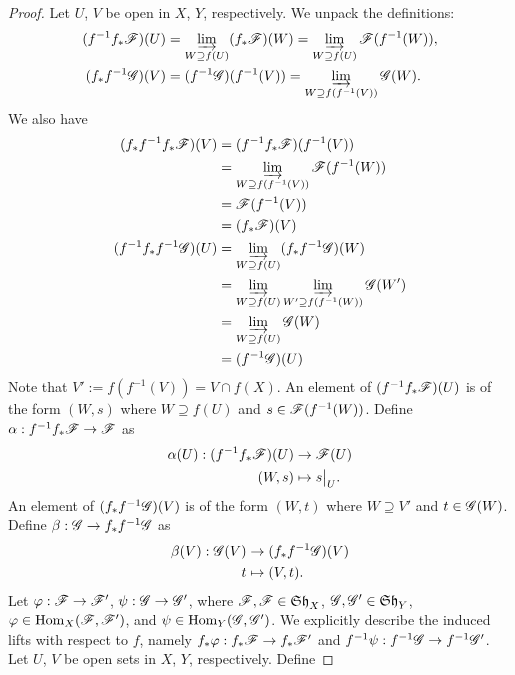 \documentclass{article}
\begin{document}
\begin{enumerate} [label=\textbf{\arabic*.}, leftmargin=0em]
\begin{proof}
    Let $U$, $V$ be open in $X$, $Y$, respectively. We unpack the definitions:
    \begin{align*}
        (f^{-1} f_* \mathscr{F})(U) & = \varinjlim_{W \supseteq f(U)} (f_* \mathscr{F})(W) = \varinjlim_{W \supseteq f(U)} \mathscr{F}(f^{-1}(W)), \\ 
        (f_* f^{-1} \mathscr{G})(V) & = (f^{-1} \mathscr{G})(f^{-1}(V)) = \varinjlim_{W \supseteq f(f^{-1}(V))} \mathscr{G}(W).
    \end{align*}
    We also have
    \begin{align*}
        (f_*f^{-1}f_* \mathscr{F})(V) & = (f^{-1} f_* \mathscr{F})(f^{-1}(V)) \\
        & = \varinjlim_{W \supseteq f(f^{-1}(V))} \mathscr{F}(f^{-1}(W)) \\
        & = \mathscr{F}(f^{-1}(V)) \\
        & = (f_* \mathscr{F})(V) \\
        (f^{-1} f_* f^{-1} \mathscr{G})(U) & = \varinjlim_{W \supseteq f(U)} (f_* f^{-1} \mathscr{G})(W) \\
        & = \varinjlim_{W \supseteq f(U)} \varinjlim_{W' \supseteq f(f^{-1}(W))} \mathscr{G}(W') \\
        & = \varinjlim_{W \supseteq f(U)} \mathscr{G}(W) \\
        & = (f^{-1} \mathscr{G})(U)
    \end{align*}
    Note that $V' := f(f^{-1}(V)) = V \cap f(X)$. An element of $(f^{-1} f_* \mathscr{F})(U)$ is of the form $(W, s)$ where $W \supseteq f(U)$ and $s \in \mathscr{F}(f^{-1}(W))$. Define $\alpha : f^{-1} f_* \mathscr{F} \to \mathscr{F}$ as
    \begin{align*}
        \alpha(U) : (f^{-1}f_* \fF)(U) & \to \fF(U) \\
        (W, s) & \mapsto \restr{s}{U}.
    \end{align*}
    An element of $(f_* f^{-1} \mathscr{G})(V)$ is of the form $(W, t)$ where $W \supseteq V'$ and $t \in \mathscr{G}(W)$. Define $\beta : \mathscr{G} \to f_* f^{-1} \mathscr{G}$ as
    \begin{align*}
        \beta(V) : \mathscr{G}(V) & \to (f_* f^{-1} \mathscr{G})(V) \\
        t & \mapsto (V, t).
    \end{align*}
    Let $\varphi : \mathscr{F} \to \mathscr{F}'$, $\psi : \mathscr{G} \to \mathscr{G}'$, where $\mathscr{F}, \mathscr{F} \in \mathfrak{Sh}_X$, $\mathscr{G}, \mathscr{G}' \in \mathfrak{Sh}_Y$, $\varphi \in \operatorname{Hom}_X(\mathscr{F}, \mathscr{F}')$, and $\psi \in \operatorname{Hom}_Y(\mathscr{G}, \mathscr{G}')$. We explicitly describe the induced lifts with respect to $f$, namely $f_*\varphi : f_* \mathscr{F} \to f_* \mathscr{F}'$ and $f^{-1} \psi : f^{-1} \mathscr{G} \to f^{-1} \mathscr{G}'$. Let $U$, $V$ be open sets in $X$, $Y$, respectively. Define

\end{proof}
\end{enumerate}
\end{document}
